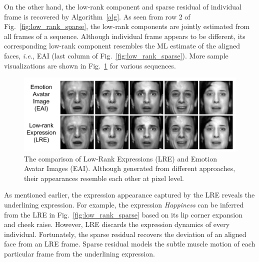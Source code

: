 \documentclass[journal]{IEEEtran}
\begin{document}
On the other hand, the low-rank component and sparse residual of individual frame is recovered by Algorithm~\ref{alg}. As seen from row 2 of Fig.~\ref{fig:low_rank_sparse}, the low-rank components are jointly estimated from all frames of a sequence. Although individual frame appears to be different, its corresponding low-rank component resembles the ML estimate of the aligned faces, \textit{i.e.}, EAI (last column of Fig.~\ref{fig:low_rank_sparse}). More sample visualizations are shown in Fig.~\ref{fig:eai_lre_compare} for various sequences. 


\begin{figure}[htbp]
	\centering
		\includegraphics[width=\columnwidth]{pics/eai_lre_compare.png}
	\caption{The comparison of Low-Rank Expressions (LRE) and Emotion Avatar Images (EAI). Although generated from different approaches, their appearances resemble each other at pixel level.}
	\label{fig:eai_lre_compare}
\end{figure}

As mentioned earlier, the expression appearance captured by the LRE reveals the underlining expression. For example, the expression \textit{Happiness} can be inferred from the LRE in Fig.~\ref{fig:low_rank_sparse} based on its lip corner expansion and cheek raise. However, LRE discards the expression dynamics of every individual. Fortunately, the sparse residual recovers the deviation of an aligned face from an LRE frame. Sparse residual models the subtle muscle motion of each particular frame from the underlining expression. 
\end{document}
